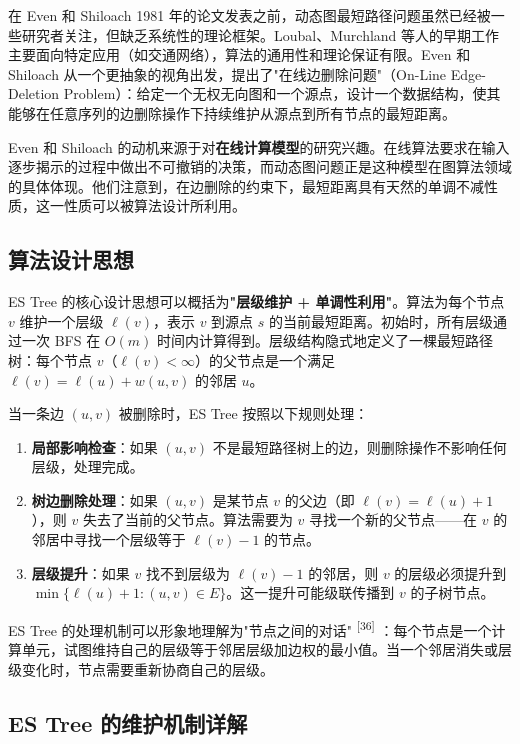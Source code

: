 \documentclass[12pt,a4paper]{ctexart}
\begin{document}
在 Even 和 Shiloach 1981 年的论文发表之前，动态图最短路径问题虽然已经被一些研究者关注，但缺乏系统性的理论框架。Loubal、Murchland 等人的早期工作主要面向特定应用（如交通网络），算法的通用性和理论保证有限。Even 和 Shiloach 从一个更抽象的视角出发，提出了"在线边删除问题"（On-Line Edge-Deletion Problem）：给定一个无权无向图和一个源点，设计一个数据结构，使其能够在任意序列的边删除操作下持续维护从源点到所有节点的最短距离。

Even 和 Shiloach 的动机来源于对\textbf{在线计算模型}的研究兴趣。在线算法要求在输入逐步揭示的过程中做出不可撤销的决策，而动态图问题正是这种模型在图算法领域的具体体现。他们注意到，在边删除的约束下，最短距离具有天然的单调不减性质，这一性质可以被算法设计所利用。

\subsection{算法设计思想}

ES Tree 的核心设计思想可以概括为\textbf{"层级维护 + 单调性利用"}。算法为每个节点 $v$ 维护一个层级 $\ell(v)$，表示 $v$ 到源点 $s$ 的当前最短距离。初始时，所有层级通过一次 BFS 在 $O(m)$ 时间内计算得到。层级结构隐式地定义了一棵最短路径树：每个节点 $v$（$\ell(v)<\infty$）的父节点是一个满足 $\ell(v)=\ell(u)+w(u,v)$ 的邻居 $u$。

当一条边 $(u,v)$ 被删除时，ES Tree 按照以下规则处理：

\begin{enumerate}
\item \textbf{局部影响检查}：如果 $(u,v)$ 不是最短路径树上的边，则删除操作不影响任何层级，处理完成。
\item \textbf{树边删除处理}：如果 $(u,v)$ 是某节点 $v$ 的父边（即 $\ell(v)=\ell(u)+1$），则 $v$ 失去了当前的父节点。算法需要为 $v$ 寻找一个新的父节点——在 $v$ 的邻居中寻找一个层级等于 $\ell(v)-1$ 的节点。
\item \textbf{层级提升}：如果 $v$ 找不到层级为 $\ell(v)-1$ 的邻居，则 $v$ 的层级必须提升到 $\min\{\ell(u)+1:(u,v)\in E\}$。这一提升可能级联传播到 $v$ 的子树节点。

\end{enumerate}
ES Tree 的处理机制可以形象地理解为"节点之间的对话" \textsuperscript{[36]} ：每个节点是一个计算单元，试图维持自己的层级等于邻居层级加边权的最小值。当一个邻居消失或层级变化时，节点需要重新协商自己的层级。

\subsection{ES Tree 的维护机制详解}
\end{document}
